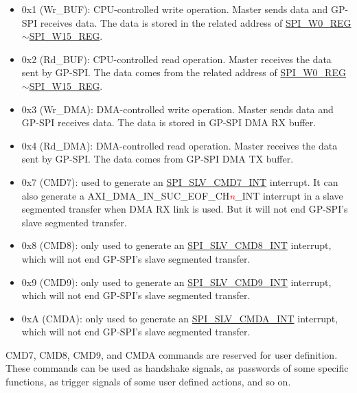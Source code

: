 \documentclass[main\_\_EN.tex]{subfiles}
\begin{document}
\begin{itemize}
    \item \label{cmd:wrbuf} 0x1 (Wr\_BUF): CPU-controlled write operation. Master sends data and GP-SPI receives data. The data is stored in the related address of \hyperref[regdesc:SPIW0REG]{SPI\_W0\_REG}$\sim$\hyperref[regdesc:SPIW15REG]{SPI\_W15\_REG}.

    \item \label{cmd:rdbuf} 0x2 (Rd\_BUF): CPU-controlled read operation. Master receives the data sent by GP-SPI. The data comes from the related address of \hyperref[regdesc:SPIW0REG]{SPI\_W0\_REG}$\sim$\hyperref[regdesc:SPIW15REG]{SPI\_W15\_REG}.

    \item \label{cmd:wrdma} 0x3 (Wr\_DMA): DMA-controlled write operation. Master sends data and GP-SPI receives data. The data is stored in GP-SPI DMA RX buffer.

    \item 0x4 (Rd\_DMA): DMA-controlled read operation. Master receives the data sent by GP-SPI. The data comes from GP-SPI DMA TX buffer.

    \item \label{cmd:CMD7} 0x7 (CMD7): used to generate an \hyperref[int:SPISLVCMD7INT]{SPI\_SLV\_CMD7\_INT} interrupt. It can also generate a AXI\_DMA\_IN\_SUC\_EOF\_CH\textcolor{red}{\it{n}}\_INT  interrupt in a slave segmented transfer when DMA RX link is used. But it will not end GP-SPI’s slave segmented transfer.

    \item 0x8 (CMD8): only used to generate an \hyperref[int:SPISLVCMD8INT]{SPI\_SLV\_CMD8\_INT} interrupt, which will not end GP-SPI’s slave segmented transfer.

    \item 0x9 (CMD9): only used to generate an \hyperref[int:SPISLVCMD9INT]{SPI\_SLV\_CMD9\_INT} interrupt, which will not end GP-SPI’s slave segmented transfer.

    \item 0xA (CMDA): only used to generate an \hyperref[int:SPISLVCMDAINT]{SPI\_SLV\_CMDA\_INT} interrupt, which will not end GP-SPI’s slave segmented transfer.

\end{itemize}

CMD7, CMD8, CMD9, and CMDA commands are reserved for user definition. These commands can be used as handshake signals, as passwords of some specific functions, as trigger signals of some user defined actions, and so on.
\end{document}
